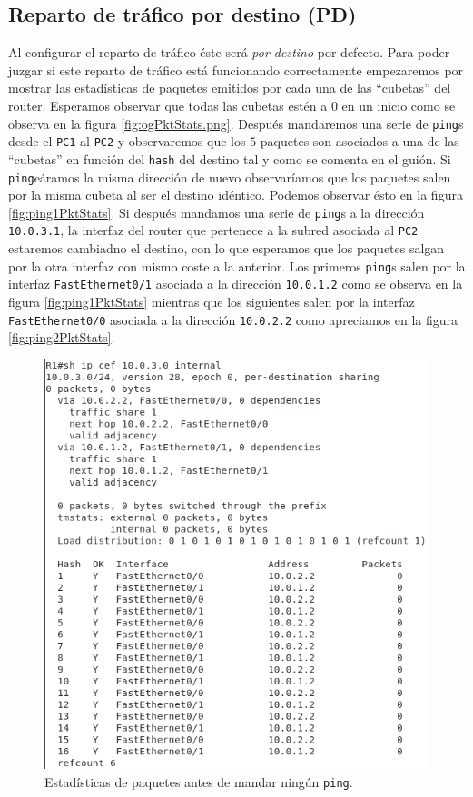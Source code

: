 \documentclass[11pt]{article}
\begin{document}
        \subsection{Reparto de tráfico por destino (PD)}
            Al configurar el reparto de tráfico éste será \textit{por destino} por defecto. Para poder juzgar si este reparto de tráfico está funcionando correctamente empezaremos por mostrar las estadísticas de paquetes emitidos por cada una de las ``cubetas'' del router. Esperamos observar que todas las cubetas estén a $0$ en un inicio como se observa en la figura \ref{fig:ogPktStats.png}. Después mandaremos una serie de \texttt{ping}s desde el \texttt{PC1} al \texttt{PC2} y observaremos que los $5$ paquetes son asociados a una de las ``cubetas'' en función del \texttt{hash} del destino tal y como se comenta en el guión. Si \texttt{ping}eáramos la misma dirección de nuevo observaríamos que los paquetes salen por la misma cubeta al ser el destino idéntico. Podemos observar ésto en la figura \ref{fig:ping1PktStats}. Si después mandamos una serie de \texttt{ping}s a la dirección \texttt{10.0.3.1}, la interfaz del router que pertenece a la subred asociada al \texttt{PC2} estaremos cambiadno el destino, con lo que esperamos que los paquetes salgan por la otra interfaz con mismo coste a la anterior. Los primeros \texttt{ping}s salen por la interfaz \texttt{FastEthernet0/1} asociada a la dirección \texttt{10.0.1.2} como se observa en la figura \ref{fig:ping1PktStats} mientras que los siguientes salen por la interfaz \texttt{FastEthernet0/0} asociada a la dirección \texttt{10.0.2.2} como apreciamos en la figura \ref{fig:ping2PktStats}.\\

            \begin{figure}
                \centering
                \includegraphics[width=0.6\linewidth]{ogPktStats.png}
                \caption{Estadísticas de paquetes antes de mandar ningún \texttt{ping}.}
                \label{fig:ogPktStats}
            \end{figure}
\end{document}
